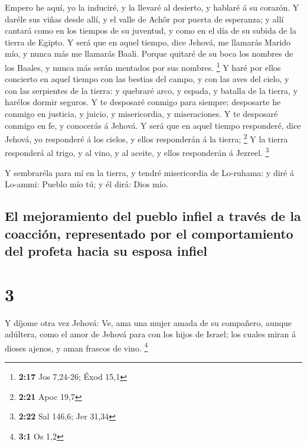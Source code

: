  Empero he aquí, yo la induciré, y la llevaré al desierto,
y hablaré á su corazón.  Y daréle sus viñas desde allí, y
el valle de Achôr por puerta de esperanza; y allí cantará como en los
tiempos de su juventud, y como en el día de su subida de la tierra de
Egipto.  Y será que en aquel tiempo, dice Jehová, me
llamarás Marido mío, y nunca más me llamarás Baali.  Porque
quitaré de su boca los nombres de los Baales, y nunca más serán mentados
por sus nombres. \footnote{\textbf{2:17} Jos 7,24-26; Éxod 15,1}
 Y haré por ellos concierto en aquel tiempo con las bestias
del campo, y con las aves del cielo, y con las serpientes de la tierra:
y quebraré arco, y espada, y batalla de la tierra, y harélos dormir
seguros.  Y te desposaré conmigo para siempre; desposarte
he conmigo en justicia, y juicio, y misericordia, y miseraciones.
 Y te desposaré conmigo en fe, y conocerás á Jehová.
 Y será que en aquel tiempo responderé, dice Jehová, yo
responderé á los cielos, y ellos responderán á la tierra; \footnote{\textbf{2:21}
  Apoc 19,7}  Y la tierra responderá al trigo, y al vino, y
al aceite, y ellos responderán á Jezreel. \footnote{\textbf{2:22} Sal
  146,6; Jer 31,34}

 Y sembraréla para mí en la tierra, y tendré misericordia
de Lo-ruhama: y diré á Lo-ammi: Pueblo mío tú; y él dirá: Dios mío.

\hypertarget{el-mejoramiento-del-pueblo-infiel-a-travuxe9s-de-la-coacciuxf3n-representado-por-el-comportamiento-del-profeta-hacia-su-esposa-infiel}{%
\subsection{El mejoramiento del pueblo infiel a través de la coacción,
representado por el comportamiento del profeta hacia su esposa
infiel}\label{el-mejoramiento-del-pueblo-infiel-a-travuxe9s-de-la-coacciuxf3n-representado-por-el-comportamiento-del-profeta-hacia-su-esposa-infiel}}

\hypertarget{section-2}{%
\section{3}\label{section-2}}

 Y díjome otra vez Jehová: Ve, ama una mujer amada de su
compañero, aunque adúltera, como el amor de Jehová para con los hijos de
Israel; los cuales miran á dioses ajenos, y aman frascos de vino.
\footnote{\textbf{3:1} Os 1,2}

